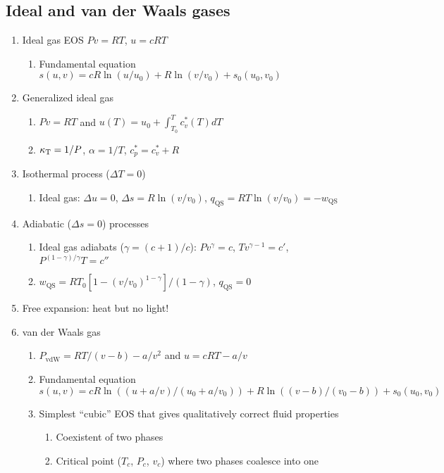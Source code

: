 \documentclass[11pt]{article}
\begin{document}
\subsection{Ideal and van der Waals gases}
\label{sec:org70fd02a}
\begin{enumerate}
\item Ideal gas EOS \(Pv=RT\), \(u=cRT\)
\begin{enumerate}
\item Fundamental equation \(s(u,v)=cR \ln(u/u_0)+R  \ln (v/v_0) + s_0(u_0,v_0)\)
\end{enumerate}

\item Generalized ideal gas
\begin{enumerate}
\item \(Pv=RT\) and \(u(T) = u_0 + \int_{T_0}^T c_v^*(T) dT\)
\item \(\kappa_{\rm T} = 1/P\), \(\alpha=1/T\), \(c_p^*=c_v^*+R\)
\end{enumerate}

\item Isothermal process (\(\Delta T=0\))
\begin{enumerate}
\item Ideal gas: \(\Delta u = 0\), \(\Delta s = R \ln(v/v_0)\), \(q_\text{QS}=RT \ln(v/v_0)=-w_\text{QS}\)
\end{enumerate}
\item Adiabatic (\(\Delta s=0\)) processes
\begin{enumerate}
\item Ideal gas adiabats (\(\gamma=(c+1)/c\)): \(P v^\gamma = c\), \(T v^{\gamma-1}=c'\), \(P^{(1-\gamma)/\gamma}T  = c''\)
\item \(w_\text{QS}=R T_0 \left [ 1-(v/v_0)^{1-\gamma} \right ]/(1-\gamma)\), \(q_\text{QS}=0\)
\end{enumerate}
\item Free expansion: heat but no light!
\item van der Waals gas
\begin{enumerate}
\item \(P_\text{vdW}=RT/(v-b) - a/v^2\) and \(u = cRT - a/v\)
\item Fundamental equation \(s(u,v)=cR \ln((u+a/v)/(u_0+a/v_0))+R  \ln ((v-b)/(v_0-b)) + s_0(u_0,v_0)\)
\item Simplest ``cubic'' EOS that gives qualitatively correct fluid properties
\begin{enumerate}
\item Coexistent of two phases
\item Critical point (\(T_c\), \(P_c\), \(v_c\)) where two phases coalesce into one
\end{enumerate}
\end{enumerate}
\end{enumerate}
\end{document}
